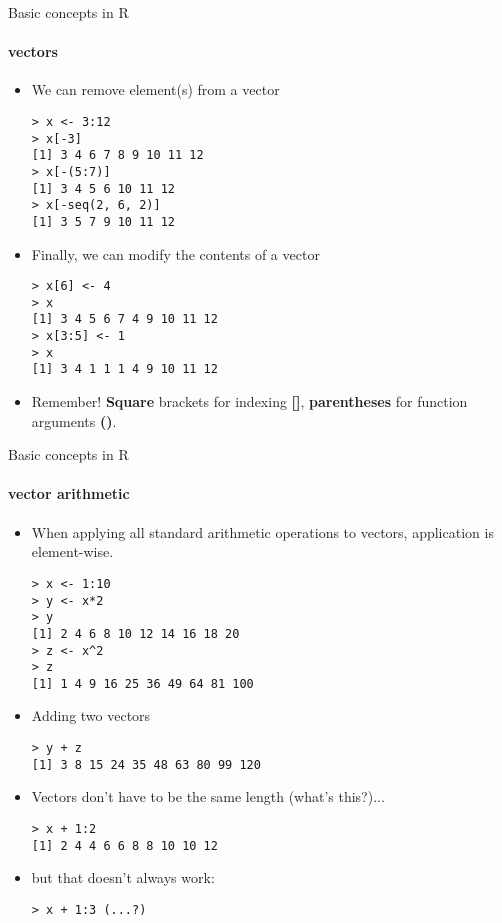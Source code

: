 \documentclass{beamer}
\begin{document}
\begin{frame}{Basic concepts in R}
    \framesubtitle{vectors}
    \begin{itemize}
        \item We can remove element(s) from a vector
        \begin{verbatim}
> x <- 3:12
> x[-3]
[1] 3 4 6 7 8 9 10 11 12
> x[-(5:7)]
[1] 3 4 5 6 10 11 12
> x[-seq(2, 6, 2)]
[1] 3 5 7 9 10 11 12\end{verbatim}
        \item Finally, we can modify the contents of a vector
        \begin{verbatim}
> x[6] <- 4
> x
[1] 3 4 5 6 7 4 9 10 11 12
> x[3:5] <- 1
> x
[1] 3 4 1 1 1 4 9 10 11 12\end{verbatim}
    \item Remember! \textbf{Square} brackets for indexing \textbf{[]}, \textbf{parentheses} for function arguments \textbf{()}.
    \end{itemize}
\end{frame}

\begin{frame}{Basic concepts in R}
    \framesubtitle{vector arithmetic}
    \begin{itemize}
        \item When applying all standard arithmetic operations to vectors, application is element-wise.
        \begin{verbatim}
> x <- 1:10
> y <- x*2
> y
[1] 2 4 6 8 10 12 14 16 18 20
> z <- x^2
> z
[1] 1 4 9 16 25 36 49 64 81 100\end{verbatim}
        \item Adding two vectors
        \begin{verbatim}
> y + z
[1] 3 8 15 24 35 48 63 80 99 120\end{verbatim}
        \item Vectors don't have to be the same length (what's this?)...
        \begin{verbatim}
> x + 1:2
[1] 2 4 4 6 6 8 8 10 10 12\end{verbatim}
        \item but that doesn't always work:
        \begin{verbatim}
> x + 1:3 (...?)\end{verbatim}
    \end{itemize}
\end{frame}
\end{document}
